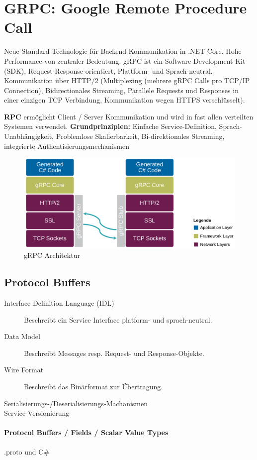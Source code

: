 \documentclass[
a4paper,
oneside,
10pt,
fleqn,
headsepline,
toc=listofnumbered, 
bibliography=totocnumbered]{scrartcl}
\let\stdsection\section
\renewcommand\section{\clearpage\stdsection}
\begin{document}
\section{GRPC: Google Remote Procedure Call}
Neue Standard-Technologie für Backend-Kommunikation in .NET Core. Hohe Performance von zentraler Bedeutung. gRPC ist ein Software Development Kit (SDK), Request-Response-orientiert, Plattform- und Sprach-neutral.
Kommunikation über HTTP/2 (Multiplexing (mehrere gRPC Calls pro TCP/IP Connection), Bidirectionales Streaming, Parallele Requests und Responses in einer einzigen TCP Verbindung, Kommunikation wegen HTTPS verschlüsselt).

\textbf{RPC} ermöglicht Client / Server Kommunikation und wird in fast allen verteilten Systemen verwendet.
\textbf{Grundprinzipien:} Einfache Service-Definition, Sprach-Unabhängigkeit, Problemlose Skalierbarkeit, Bi-direktionales Streaming, integrierte Authentisierungsmechanismen
\begin{figure}[!ht]
	\centering
	\includegraphics[width=0.6\linewidth]{images/grpc_architektur.png}
	\caption{gRPC Architektur}
	\label{fig:grpcarchitektur}
\end{figure}

\subsection{Protocol Buffers}
\begin{description}
	\item[Interface Definition Language (IDL)] Beschreibt ein Service Interface platform- und sprach-neutral.
	\item[Data Model] Beschreibt Messages resp. Request- und Response-Objekte.
	\item[Wire Format] Beschreibt das Binärformat zur Übertragung.
	\item[Serialisierungs-/Deserialisierungs-Machanismen]
	\item[Service-Versionierung]
\end{description}

\paragraph{Protocol Buffers / Fields / Scalar Value Types} .proto und C\#
\end{document}
